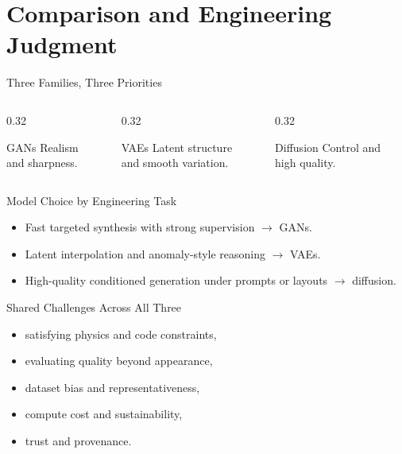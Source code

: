 \documentclass[12pt]{beamer}
\begin{document}
\section{Comparison and Engineering Judgment}

\begin{frame}{Three Families, Three Priorities}
  \small
  \begin{columns}[T]
    \begin{column}{0.32\textwidth}
      \begin{conceptbox}{GANs}
        Realism\\and sharpness.
      \end{conceptbox}
    \end{column}
    \begin{column}{0.32\textwidth}
      \begin{conceptbox}{VAEs}
        Latent structure\\and smooth variation.
      \end{conceptbox}
    \end{column}
    \begin{column}{0.32\textwidth}
      \begin{conceptbox}{Diffusion}
        Control and\\high quality.
      \end{conceptbox}
    \end{column}
  \end{columns}
\end{frame}

\begin{frame}{Model Choice by Engineering Task}
  \begin{itemize}
    \item Fast targeted synthesis with strong supervision $\rightarrow$ GANs.
    \item Latent interpolation and anomaly-style reasoning $\rightarrow$ VAEs.
    \item High-quality conditioned generation under prompts or layouts $\rightarrow$ diffusion.
  \end{itemize}
\end{frame}

\begin{frame}{Shared Challenges Across All Three}
  \begin{itemize}
    \item satisfying physics and code constraints,
    \item evaluating quality beyond appearance,
    \item dataset bias and representativeness,
    \item compute cost and sustainability,
    \item trust and provenance.
  \end{itemize}
\end{frame}
\end{document}
